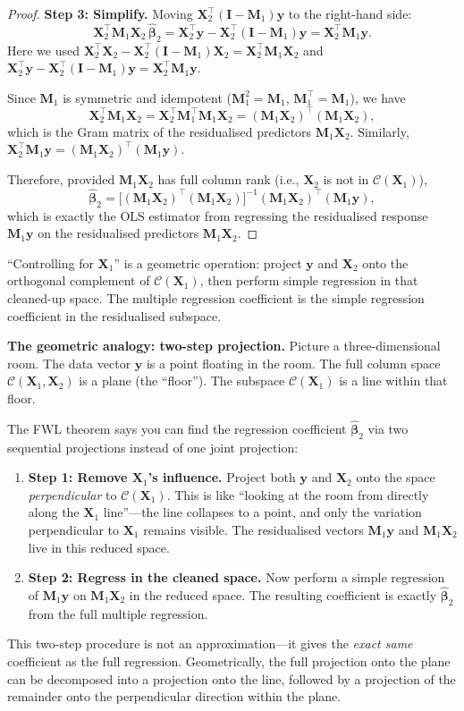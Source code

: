 \documentclass[11pt,a4paper]{article}
\theoremstyle{plain}
\theoremstyle{definition}
\newcommand{\bhat}{\hat{\bm{\beta}}}
\newcommand{\bX}{\bm{X}}
\newcommand{\by}{\bm{y}}
\newcommand{\bM}{\bm{M}}
\newcommand{\bI}{\bm{I}}
\newcommand{\Col}{\mathcal{C}}
\begin{document}
\begin{proof}
\noindent\textbf{Step 3: Simplify.}
Moving $\bX_2^\top(\bI-\bM_1)\by$ to the right-hand side:
\[
  \bX_2^\top\bM_1\bX_2\,\bhat_2
  = \bX_2^\top\by - \bX_2^\top(\bI-\bM_1)\by
  = \bX_2^\top\bM_1\by.
\]
Here we used $\bX_2^\top\bX_2 - \bX_2^\top(\bI-\bM_1)\bX_2 = \bX_2^\top\bM_1\bX_2$
and $\bX_2^\top\by - \bX_2^\top(\bI-\bM_1)\by = \bX_2^\top\bM_1\by$.

Since $\bM_1$ is symmetric and idempotent ($\bM_1^2 = \bM_1$, $\bM_1^\top = \bM_1$),
we have
\[
  \bX_2^\top\bM_1\bX_2 = \bX_2^\top\bM_1^\top\bM_1\bX_2
  = (\bM_1\bX_2)^\top(\bM_1\bX_2),
\]
which is the Gram matrix of the residualised predictors $\bM_1\bX_2$.
Similarly, $\bX_2^\top\bM_1\by = (\bM_1\bX_2)^\top(\bM_1\by)$.

Therefore, provided $\bM_1\bX_2$ has full column rank (i.e., $\bX_2$ is not
in $\Col(\bX_1)$),
\[
  \boxed{\bhat_2
  = \bigl[(\bM_1\bX_2)^\top(\bM_1\bX_2)\bigr]^{-1}(\bM_1\bX_2)^\top(\bM_1\by),}
\]
which is exactly the OLS estimator from regressing the residualised response
$\bM_1\by$ on the residualised predictors $\bM_1\bX_2$.
\end{proof}

\begin{keyinsight}
``Controlling for $\bX_1$'' is a geometric operation: project
$\by$ and $\bX_2$ onto the orthogonal complement of $\Col(\bX_1)$,
then perform simple regression in that cleaned-up space.
The multiple regression coefficient is the simple regression coefficient
in the residualised subspace.
\end{keyinsight}

\medskip
\noindent\textbf{The geometric analogy: two-step projection.}
Picture a three-dimensional room. The data vector $\by$ is a point floating in the room. The full column space $\Col(\bX_1, \bX_2)$ is a plane (the ``floor''). The subspace $\Col(\bX_1)$ is a line within that floor.

The FWL theorem says you can find the regression coefficient $\bhat_2$ via two sequential projections instead of one joint projection:
\begin{enumerate}[nosep]
  \item \textbf{Step 1: Remove $\bX_1$'s influence.}
    Project both $\by$ and $\bX_2$ onto the space \emph{perpendicular} to $\Col(\bX_1)$.
    This is like ``looking at the room from directly along the $\bX_1$ line''---the line collapses to a point, and only the variation perpendicular to $\bX_1$ remains visible.
    The residualised vectors $\bM_1\by$ and $\bM_1\bX_2$ live in this reduced space.
  \item \textbf{Step 2: Regress in the cleaned space.}
    Now perform a simple regression of $\bM_1\by$ on $\bM_1\bX_2$ in the reduced space.
    The resulting coefficient is exactly $\bhat_2$ from the full multiple regression.
\end{enumerate}
This two-step procedure is not an approximation---it gives the \emph{exact same} coefficient as the full regression.
Geometrically, the full projection onto the plane can be decomposed into a projection onto the line, followed by a projection of the remainder onto the perpendicular direction within the plane.
\end{document}
